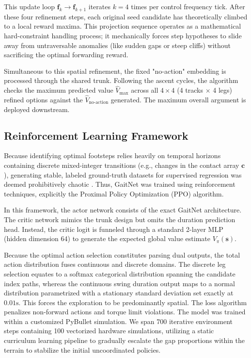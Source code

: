 This update loop $\mathbf{f}_{k} \rightarrow \mathbf{f}_{k+1}$
iterates $k=4$ times per control frequency tick. After these four
refinement steps, each original seed candidate has theoretically
climbed to a local reward maxima. This projection sequence operates
as a mathematical hard-constraint handling process; it mechanically
forces step hypotheses to slide away from untraversable anomalies
(like sudden gaps or steep cliffs) without sacrificing the optimal
forwarding reward.

Simultaneous to this spatial refinement, the fixed "no-action"
embedding is processed through the shared trunk. Following the ascent
cycles, the algorithm checks the maximum predicted value
$\hat{V}_{\text{max}}$ across all $4 \times 4$ (4 tracks $\times$ 4
legs) refined options against the $\hat{V}_{\text{no-action}}$
generated. The maximum overall argument is deployed downstream.

\subsection{Reinforcement Learning Framework}
\label{subsec:methodology-gaitnet-training}

Because identifying optimal footsteps relies heavily on temporal
horizons containing discrete mixed-integer transitions (e.g., changes
in the contact array $\mathbf{c}$), generating stable, labeled
ground-truth datasets for supervised regression was deemed
prohibitively chaotic \cite{Geisert2019contact-planning}. Thus,
GaitNet was trained using reinforcement techniques, explicitly the
Proximal Policy Optimization (PPO) algorithm.

In this framework, the actor network consists of the exact GaitNet
architecture. The critic network mimics the trunk design but omits
the duration prediction head. Instead, the critic logit is funneled
through a standard 2-layer MLP (hidden dimension 64) to generate the
expected global value estimate $V_{\pi}(\mathbf{s})$.

Because the optimal action selection constitutes parsing dual
outputs, the total action distribution fuses continuous and discrete
domains. The discrete leg selection equates to a softmax categorical
distribution spanning the candidate index paths, whereas the
continuous swing duration output maps to a normal distribution
parametrized with a stationary standard deviation set exactly at
$0.01\text{s}$. This forces the exploration to be predominantly
spatial. The loss algorithm penalizes non-forward actions and torque
limit violations. The model was trained within a customized PyBullet
simulation. We span 700 iterative environment steps containing 100
vectorized hardware simulations, utilizing a static curriculum
learning pipeline to gradually escalate the gap proportions within
the terrain to stabilize the initial uncoordinated policies.

